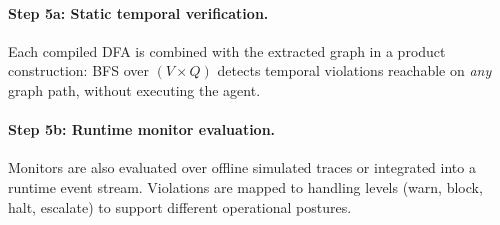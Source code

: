 \paragraph{Step 5a: Static temporal verification.}
Each compiled DFA is combined with the extracted graph in a product
construction: BFS over $(V \times Q)$ detects temporal violations
reachable on \emph{any} graph path, without executing the agent.

\paragraph{Step 5b: Runtime monitor evaluation.}
Monitors are also evaluated over offline simulated traces or integrated
into a runtime event stream. Violations are mapped to handling levels
(warn, block, halt, escalate) to support different operational postures.

